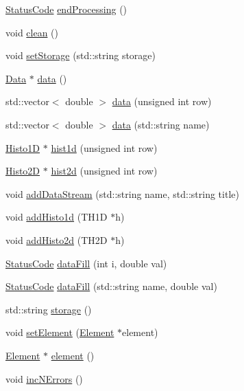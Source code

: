\begin{DoxyCompactItemize}
\item 
\hyperlink{classStatusCode}{StatusCode} \hyperlink{classProcessus_a5e4da662989d356b89d490b89c7afbfd}{endProcessing} ()
\item 
void \hyperlink{classProcessus_aaeb17673b98d2b39f3aa780e335e0968}{clean} ()
\item 
void \hyperlink{classProcessus_ad57a29b33f9021eda9f6929136f1784f}{setStorage} (std::string storage)
\item 
\hyperlink{classData}{Data} $\ast$ \hyperlink{classProcessus_a16e45f329fbce935aeef0ff3cb508228}{data} ()
\item 
std::vector$<$ double $>$ \hyperlink{classProcessus_aa7c57483cf4b9ab0b2d0ae2de8316402}{data} (unsigned int row)
\item 
std::vector$<$ double $>$ \hyperlink{classProcessus_abf4d91fb36707e1d50178bab12d21ae9}{data} (std::string name)
\item 
\hyperlink{classHisto1D}{Histo1D} $\ast$ \hyperlink{classProcessus_a409227db936baff03c0462c1bcfe8069}{hist1d} (unsigned int row)
\item 
\hyperlink{classHisto2D}{Histo2D} $\ast$ \hyperlink{classProcessus_a73b5118cb5f2b5eaad33286183b86cfc}{hist2d} (unsigned int row)
\item 
void \hyperlink{classProcessus_a308c8f193802f1d1ab49d4447d0cb281}{addDataStream} (std::string name, std::string title)
\item 
void \hyperlink{classProcessus_ad46e0d4dfdfdcbce001ee6be1746dfa4}{addHisto1d} (TH1D $\ast$h)
\item 
void \hyperlink{classProcessus_ac1ed1aed5edaeabdf18aa56775440471}{addHisto2d} (TH2D $\ast$h)
\item 
\hyperlink{classStatusCode}{StatusCode} \hyperlink{classProcessus_a0d093b48f3218a088ba030e24372f18c}{dataFill} (int i, double val)
\item 
\hyperlink{classStatusCode}{StatusCode} \hyperlink{classProcessus_aa31ab71711f7af6a729441ff573f69c9}{dataFill} (std::string name, double val)
\item 
std::string \hyperlink{classProcessus_a33fa1a0b54a636e5cdd680669fd9ea51}{storage} ()
\item 
void \hyperlink{classProcessus_a8ddef94227d83d9dae2cd49aebc33353}{setElement} (\hyperlink{classElement}{Element} $\ast$element)
\item 
\hyperlink{classElement}{Element} $\ast$ \hyperlink{classProcessus_a6fe155527431a7190b7d44d600b9608d}{element} ()
\item 
void \hyperlink{classProcessus_abe603d0636f76db6aa6c5c60cf34c591}{incNErrors} ()

\end{DoxyCompactItemize}
